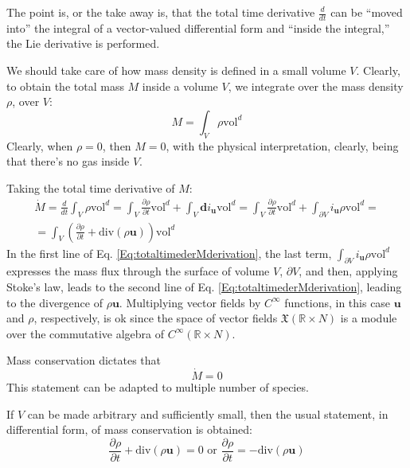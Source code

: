 \documentclass[10pt]{amsart}
\begin{document}
\begin{multicols*}{2}
The point is, or the take away is, that the total time derivative $\frac{d}{dt}$ can be ``moved into'' the integral of a vector-valued differential form and ``inside the integral,'' the Lie derivative is performed.  

We should take care of how mass density is defined in a small volume $V$.  Clearly, to obtain the total mass $M$ inside a volume $V$, we integrate over the mass density $\rho$, over $V$:
\begin{equation}
  M = \int_V \rho \text{vol}^d
  \end{equation}
Clearly, when $\rho=0$, then $M=0$, with the physical interpretation, clearly, being that there's no gas inside $V$.

Taking the total time derivative of $M$:
\begin{equation}\label{Eq:totaltimederMderivation}
\begin{gathered}
  \dot{M} = \frac{d}{dt} \int_V \rho \text{vol}^d = \int_V \frac{ \partial \rho }{ \partial t} \text{vol}^d + \int_V \mathbf{d}i_{\mathbf{u} } \text{vol}^d = \int_V \frac{ \partial \rho }{ \partial t} \text{vol}^d + \int_{\partial V} i_{\mathbf{u}}\rho \text{vol}^d = \\
  = \int_V \left( \frac{ \partial \rho }{ \partial t} + \text{div}(\rho \mathbf{u} ) \right) \text{vol}^d
  \end{gathered}
  \end{equation}
In the first line of Eq. \ref{Eq:totaltimederMderivation}, the last term, $\int_{\partial V} i_{\mathbf{u}}\rho \text{vol}^d$ expresses the mass flux through the surface of volume $V$, $\partial V$, and then, applying Stoke's law, leads to the second line of Eq. \ref{Eq:totaltimederMderivation}, leading to the divergence of $\rho \mathbf{u}$.  Multiplying vector fields by $C^{\infty}$ functions, in this case $\mathbf{u}$ and $\rho$, respectively, is ok since the space of vector fields $\mathfrak{X}(\mathbb{R}\times N)$ is a module over the commutative algebra of $C^{\infty}(\mathbb{R}\times N)$.

Mass conservation dictates that
\begin{equation}
  \dot{M} = 0 
  \end{equation}
This statement can be adapted to multiple number of species.

If $V$ can be made arbitrary and sufficiently small, then the usual statement, in differential form, of mass conservation is obtained:
\begin{equation}\label{Eq:massconsvdiff}
\frac{ \partial \rho}{\partial t} + \text{div}(\rho \mathbf{u} ) = 0 \text{ or } \frac{ \partial \rho }{ \partial t} = -\text{div}(\rho \mathbf{u} )
\end{equation}


\end{multicols*}
\end{document}
